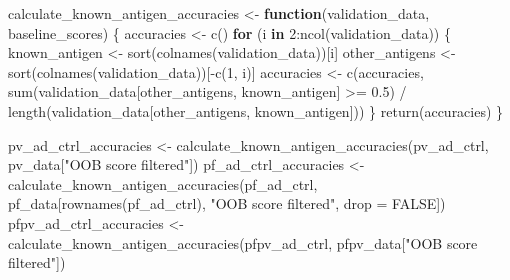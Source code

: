 \documentclass[
  11pt,
  oneside]{book}
\newenvironment{Shaded}{\begin{snugshade}}{\end{snugshade}}
\newcommand{\AttributeTok}[1]{\textcolor[rgb]{0.77,0.63,0.00}{#1}}
\newcommand{\ConstantTok}[1]{\textcolor[rgb]{0.00,0.00,0.00}{#1}}
\newcommand{\ControlFlowTok}[1]{\textcolor[rgb]{0.13,0.29,0.53}{\textbf{#1}}}
\newcommand{\DecValTok}[1]{\textcolor[rgb]{0.00,0.00,0.81}{#1}}
\newcommand{\FloatTok}[1]{\textcolor[rgb]{0.00,0.00,0.81}{#1}}
\newcommand{\FunctionTok}[1]{\textcolor[rgb]{0.00,0.00,0.00}{#1}}
\newcommand{\NormalTok}[1]{#1}
\newcommand{\OtherTok}[1]{\textcolor[rgb]{0.56,0.35,0.01}{#1}}
\newcommand{\SpecialCharTok}[1]{\textcolor[rgb]{0.00,0.00,0.00}{#1}}
\newcommand{\StringTok}[1]{\textcolor[rgb]{0.31,0.60,0.02}{#1}}
\begin{document}
\begin{Shaded}
\begin{Highlighting}[]
\NormalTok{calculate\_known\_antigen\_accuracies }\OtherTok{\textless{}{-}} \ControlFlowTok{function}\NormalTok{(validation\_data, baseline\_scores) \{}
\NormalTok{  accuracies }\OtherTok{\textless{}{-}} \FunctionTok{c}\NormalTok{()}
  \ControlFlowTok{for}\NormalTok{ (i }\ControlFlowTok{in} \DecValTok{2}\SpecialCharTok{:}\FunctionTok{ncol}\NormalTok{(validation\_data)) \{}
\NormalTok{    known\_antigen }\OtherTok{\textless{}{-}} \FunctionTok{sort}\NormalTok{(}\FunctionTok{colnames}\NormalTok{(validation\_data))[i]}
\NormalTok{    other\_antigens }\OtherTok{\textless{}{-}} \FunctionTok{sort}\NormalTok{(}\FunctionTok{colnames}\NormalTok{(validation\_data))[}\SpecialCharTok{{-}}\FunctionTok{c}\NormalTok{(}\DecValTok{1}\NormalTok{, i)]}
\NormalTok{    accuracies }\OtherTok{\textless{}{-}} \FunctionTok{c}\NormalTok{(accuracies, }\FunctionTok{sum}\NormalTok{(validation\_data[other\_antigens, known\_antigen] }\SpecialCharTok{\textgreater{}=} \FloatTok{0.5}\NormalTok{) }\SpecialCharTok{/} \FunctionTok{length}\NormalTok{(validation\_data[other\_antigens, known\_antigen]))}
\NormalTok{  \}}
  \FunctionTok{return}\NormalTok{(accuracies)}
\NormalTok{\}}

\NormalTok{pv\_ad\_ctrl\_accuracies }\OtherTok{\textless{}{-}} \FunctionTok{calculate\_known\_antigen\_accuracies}\NormalTok{(pv\_ad\_ctrl, pv\_data[}\StringTok{"OOB score filtered"}\NormalTok{])}
\NormalTok{pf\_ad\_ctrl\_accuracies }\OtherTok{\textless{}{-}} \FunctionTok{calculate\_known\_antigen\_accuracies}\NormalTok{(pf\_ad\_ctrl, pf\_data[}\FunctionTok{rownames}\NormalTok{(pf\_ad\_ctrl), }\StringTok{"OOB score filtered"}\NormalTok{, }\AttributeTok{drop =} \ConstantTok{FALSE}\NormalTok{])}
\NormalTok{pfpv\_ad\_ctrl\_accuracies }\OtherTok{\textless{}{-}} \FunctionTok{calculate\_known\_antigen\_accuracies}\NormalTok{(pfpv\_ad\_ctrl, pfpv\_data[}\StringTok{"OOB score filtered"}\NormalTok{])}


\end{Highlighting}
\end{Shaded}
\end{document}
